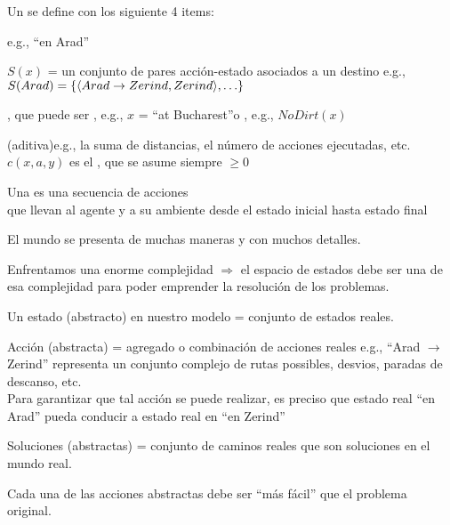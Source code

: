 \documentclass{article}
\begin{document}
\begin{huge}

Un  se define con los siguiente 4 items:

 \quad e.g., ``en Arad''

 $S(x)$ = un conjunto de
pares acci{\'o}n-estado asociados a un destino \nl e.g., $S(Arad)
= \{\langle Arad\rightarrow Zerind, Zerind\rangle, \ldots \}$

, que puede ser , e.g., $x$ = ``at Bucharest''\nl o , e.g., $NoDirt(x)$

 (aditiva)\nl e.g., la suma
de distancias, el n{\'u}mero  de acciones ejecutadas, etc.\nl
$c(x,a,y)$ es el , que se asume siempre $\geq
0$

Una  es una secuencia de acciones\\
que llevan al agente y a su ambiente desde el estado inicial hasta
estado final


El mundo se presenta de muchas maneras y con muchos detalles.

Enfrentamos una enorme complejidad \nl $\Rightarrow$ el espacio de
estados debe ser una  de esa complejidad
para poder emprender la resoluci{\'o}n de los problemas.

Un estado (abstracto) en nuestro modelo = conjunto de estados
reales.

Acci{\'o}n (abstracta)  = agregado o combinaci{\'o}n de acciones
reales\nl
   e.g., ``Arad $\rightarrow$ Zerind'' representa un conjunto
   complejo de rutas possibles, desvios, paradas de descanso,
   etc.\\

Para garantizar que tal acci{\'o}n se puede realizar, es preciso
que  estado real ``en Arad'' pueda conducir a
 estado real en ``en Zerind''

Soluciones (abstractas) =\nl
    conjunto de caminos reales que son soluciones en el mundo
    real.

Cada una de las acciones abstractas debe ser ``m{\'a}s f{\'a}cil''
que el problema original.


\end{huge}
\end{document}
